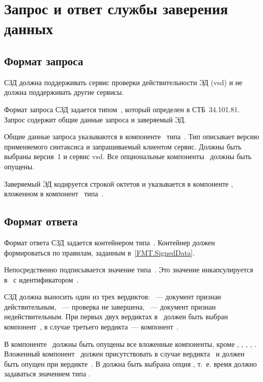 \section{Запрос и ответ службы заверения данных}\label{FMT.DVCS}

\subsection{Формат запроса}\label{FMT.DVCS.Req}

СЗД должна поддерживать сервис проверки действительности ЭД (vsd) и не должна
поддерживать другие сервисы.

Формат запроса СЗД задается типом~, который определен в 
СТБ~34.101.81. Запрос содержит общие данные запроса и заверяемый ЭД.

Общие данные запроса указываются в компоненте~
типа~. Тип описывает версию применяемого синтаксиса
и запрашиваемый клиентом сервис. Должны быть выбраны версия~1 и сервис vsd. Все
опциональные компоненты~ должны быть опущены.

Заверяемый ЭД кодируется строкой октетов и указывается в компоненте
, вложенном в компонент~ типа~.


\subsection{Формат ответа}\label{FMT.DVCS.Resp}

Формат ответа СЗД задается контейнером типа~. Контейнер должен
формироваться по правилам, заданным в~\ref{FMT.SignedData}.
 
Непосредственно подписывается значение типа~. Это значение
инкапсулируется в~ с
идентификатором~.

СЗД должна выносить один из трех вердиктов:
~--- документ признан действительным,
~--- проверка не завершена,
~--- документ признан недействительным.
%
При первых двух вердиктах в~ должен быть выбран
компонент~, в случае третьего вердикта~---
компонент~.

В компоненте~ должны быть опущены все вложенные компоненты,
кроме , , ,
, .
%
Вложенный компонент~ должен присутствовать в случае
вердикта~ и должен быть опущен при вердикте~.
%
В  должна быть выбрана опция , т.~е. время
должно задаваться значением типа .

